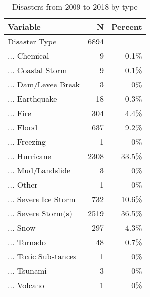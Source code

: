 \begin{table}[!h] \centering \renewcommand*{\arraystretch}{1.1}\caption{Disasters from 2009 to 2018 by type}\label{DisasterTypes}
\begin{tabular}{lrr}
\hline
\hline
Variable & N & Percent \\ 
\hline
Disaster Type & 6894 &  \\ 
... Chemical & 9 & 0.1\% \\ 
... Coastal Storm & 9 & 0.1\% \\ 
... Dam/Levee Break & 3 & 0\% \\ 
... Earthquake & 18 & 0.3\% \\ 
... Fire & 304 & 4.4\% \\ 
... Flood & 637 & 9.2\% \\ 
... Freezing & 1 & 0\% \\ 
... Hurricane & 2308 & 33.5\% \\ 
... Mud/Landslide & 3 & 0\% \\ 
... Other & 1 & 0\% \\ 
... Severe Ice Storm & 732 & 10.6\% \\ 
... Severe Storm(s) & 2519 & 36.5\% \\ 
... Snow & 297 & 4.3\% \\ 
... Tornado & 48 & 0.7\% \\ 
... Toxic Substances & 1 & 0\% \\ 
... Tsunami & 3 & 0\% \\ 
... Volcano & 1 & 0\%\\ 
\hline
\hline
\end{tabular}
\end{table}

